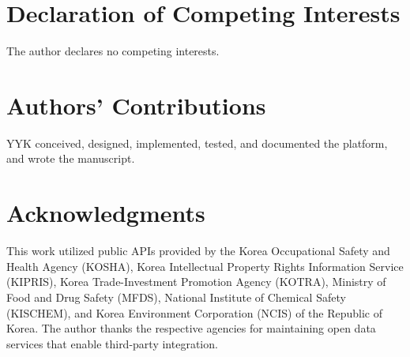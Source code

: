 \documentclass[10pt]{article}
\begin{document}
\section*{Declaration of Competing Interests}

The author declares no competing interests.

\section*{Authors' Contributions}

YYK conceived, designed, implemented, tested, and documented the platform, and wrote the manuscript.

\section*{Acknowledgments}

This work utilized public APIs provided by the Korea Occupational Safety and Health Agency (KOSHA), Korea Intellectual Property Rights Information Service (KIPRIS), Korea Trade-Investment Promotion Agency (KOTRA), Ministry of Food and Drug Safety (MFDS), National Institute of Chemical Safety (KISCHEM), and Korea Environment Corporation (NCIS) of the Republic of Korea.
The author thanks the respective agencies for maintaining open data services that enable third-party integration.
\end{document}

